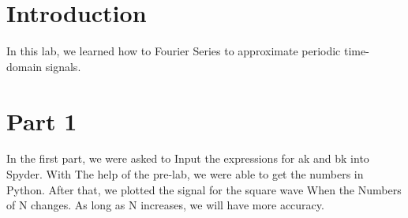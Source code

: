 \documentclass[12pt]{report}
\begin{document}
\section{Introduction}

In this lab, we learned how to Fourier Series to approximate periodic time-domain signals.
 






\section{Part 1}

In the first part, we were asked to Input the expressions for ak and bk into Spyder. With The help of the pre-lab, we were able to get the numbers in Python. After that, we plotted the signal for the square wave When the Numbers of N changes. As long as N increases, we will have more accuracy.

    
\end{document}
